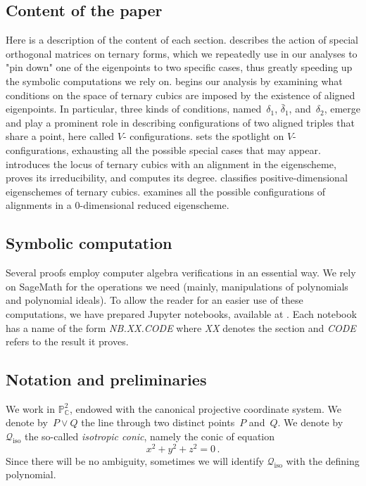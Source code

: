 \documentclass[a4paper, 11pt, reqno]{amsart}
\theoremstyle{plain}
\theoremstyle{definition}
\newcommand{\C}{\mathbb{C}}
\newcommand{\p}{\mathbb{P}}
\newcommand{\nb}[2]{\textsl{{NB}.{#1}.{#2}}}
\newcommand{\iso}{\mathcal{Q}_{\mathrm{iso}}}
\begin{document}
\subsection*{Content of the paper}
Here is a description of the content of each section.
 describes the action of special orthogonal matrices on ternary forms, which we repeatedly use in our analyses to "pin down" one of the eigenpoints to two specific cases, thus greatly speeding up the symbolic computations we rely on.
 begins our analysis by examining what conditions on the space of ternary cubics are imposed by the existence of aligned eigenpoints. In particular, three kinds of conditions, named~$\delta_1$, $\bar{\delta}_1$, and~$\delta_2$, emerge and play a prominent role in describing configurations of two aligned triples that share a point, here called $V$- configurations.
 sets the spotlight on $V$- configurations, exhausting all the possible special cases that may appear.
 introduces the locus of ternary cubics with an alignment in the eigenscheme, proves its irreducibility, and computes its degree.
 classifies positive-dimensional eigenschemes of ternary cubics.
 examines all the possible configurations of alignments in a $0$-dimensional reduced eigenscheme.

\subsection*{Symbolic computation}
Several proofs employ computer algebra verifications in an essential way.
We rely on SageMath \cite{SageMath} for the operations we need
(mainly, manipulations of polynomials and polynomial ideals).
To allow the reader for an easier use of these computations, we have prepared Jupyter notebooks, available at \cite{Notebooks}.
Each notebook has a name of the form \nb{XX}{CODE} where \textit{XX} denotes the section and \textit{CODE} refers to the result it proves.

\subsection*{Notation and preliminaries}
We work in $\p^2_\C$, endowed with the canonical projective coordinate system.
We denote by~$P \vee Q$ the line through two distinct points~$P$ and~$Q$.
We denote by~$\iso$ the so-called \emph{isotropic conic}, namely the conic of equation
%
\[
 x^2 + y^2 + z^2 = 0 \,.
\]
%
Since there will be no ambiguity, sometimes we will identify $\iso$ with the
defining polynomial.
\end{document}
